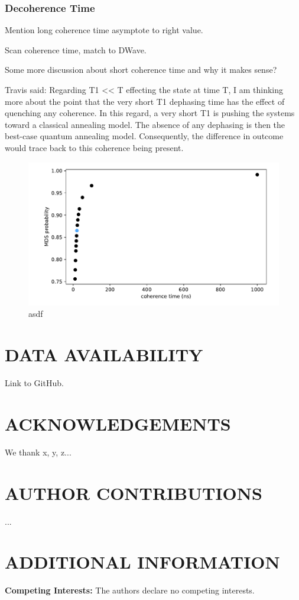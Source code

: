 \documentclass[prd,twocolumn,tightenlines,preprintnumbers,showpacs,superscriptaddress,notitlepage,nofootinbib,eqsecnum,floatfix,longbibliography]{revtex4}
\begin{document}
\subsubsection{Decoherence Time}
\label{sec:methods:deco}

Mention long coherence time asymptote to right value.

Scan coherence time, match to DWave.

Some more discussion about short coherence time and why it makes sense?

Travis said: Regarding T1 << T effecting the state at time T, I am thinking more about the point that the very short T1 dephasing time has the effect of quenching any coherence. In this regard, a very short T1 is pushing the systems toward a classical annealing model. The absence of any dephasing is then the best-case quantum annealing model. Consequently, the difference in outcome would trace back to this coherence being present. 

\begin{figure}
	\centering
	\includegraphics[width=\columnwidth]{./figures/coherence.pdf}
	\caption{asdf}
	\label{fig:prob_mi}
\end{figure}

\section{DATA AVAILABILITY}
	
Link to GitHub.

\section{ACKNOWLEDGEMENTS}

We thank x, y, z...

\section{AUTHOR CONTRIBUTIONS}

...

\section{ADDITIONAL INFORMATION}

\textbf{Competing Interests:} The authors declare no competing interests.


\end{document}
